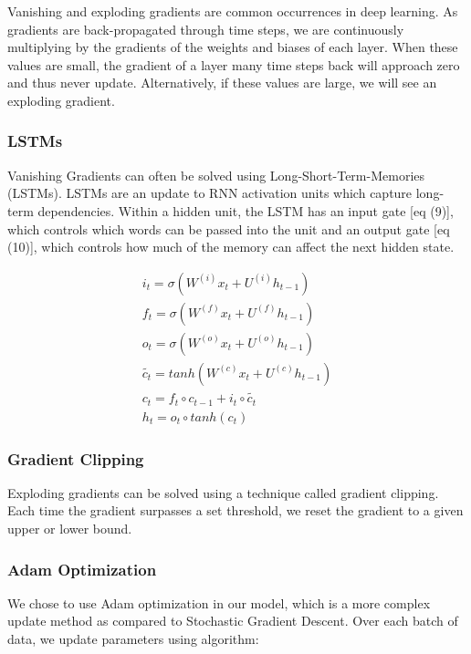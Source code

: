 \documentclass{article} %
\begin{document}
Vanishing and exploding gradients are common occurrences in deep learning. As gradients are back-propagated through time steps, we are continuously multiplying by the gradients of the weights and biases of each layer. When these values are small, the gradient of a layer many time steps back will approach zero and thus never update. Alternatively, if these values are large, we will see an exploding gradient. 

\subsubsection*{LSTMs}

Vanishing Gradients can often be solved using Long-Short-Term-Memories (LSTMs). LSTMs are an update to RNN activation units which capture long-term dependencies. Within a hidden unit, the LSTM has an input gate [eq (9)], which controls which words can be passed into the unit and an output gate [eq (10)], which controls how much of the memory can affect the next hidden state. 

\begin{gather}
i_t = \sigma (W^{(i)} x_t + U^{(i)} h_{t-1}) \\
f_t = \sigma (W^{(f)} x_t + U^{(f)} h_{t-1}) \\
o_t = \sigma (W^{(o)} x_t + U^{(o)} h_{t-1}) \\
\widetilde{c_t} = tanh (W^{(c)} x_t + U^{(c)} h_{t-1}) \\
c_t = f_t \circ c_{t - 1} + i_t \circ \widetilde{c_t} \\
h_t = o_t \circ tanh(c_t)
\end{gather}

\subsubsection*{Gradient Clipping}
Exploding gradients can be solved using a technique called gradient clipping. Each time the gradient surpasses a set threshold, we reset the gradient to a given upper or lower bound.

\subsubsection{Adam Optimization}

We chose to use Adam optimization in our model, which is a more complex update method as compared to Stochastic Gradient Descent. Over each batch of data, we update parameters using algorithm: 
\end{document}
